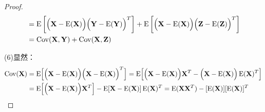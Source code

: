 \begin{proof}
\begin{gather*}
\begin{aligned}
			&=\operatorname{E}\left[\Bigl(\mathbf{X}-\operatorname{E}(\mathbf{X})\Bigr)\Bigl(\mathbf{Y}-\operatorname{E}(\mathbf{Y})\Bigr)^T\right]+\operatorname{E}\left[\Bigl(\mathbf{X}-\operatorname{E}(\mathbf{X})\Bigr)\Bigl(\mathbf{Z}-\operatorname{E}(\mathbf{Z})\Bigr)^T\right] \\
			&=\operatorname{Cov}(\mathbf{X},\mathbf{Y})+\operatorname{Cov}(\mathbf{X},\mathbf{Z})
		\end{aligned}
	\end{gather*}\par
	(6)显然：
	\begin{align*}
		\operatorname{Cov}(\mathbf{X})
		&=\operatorname{E}\Bigl[\Bigl(\mathbf{X}-\operatorname{E}(\mathbf{X})\Bigr)\Bigl(\mathbf{X}-\operatorname{E}(\mathbf{X})\Bigr)^T\Bigr]
		=\operatorname{E}\Bigl[\Bigl(\mathbf{X}-\operatorname{E}(\mathbf{X})\Bigr)\mathbf{X}^T-\Bigl(\mathbf{X}-\operatorname{E}(\mathbf{X})\Bigr)\operatorname{E}(\mathbf{X})^T\Bigr] \\
		&=\operatorname{E}\Bigl[\Bigl(\mathbf{X}-\operatorname{E}(\mathbf{X})\Bigr)\mathbf{X}^T\Bigr]-\operatorname{E}[\mathbf{X}-\operatorname{E}(\mathbf{X})]\operatorname{E}(\mathbf{X})^T =\operatorname{E}(\mathbf{X}\mathbf{X}^T)-[\operatorname{E}(\mathbf{X})][\operatorname{E}(\mathbf{X})]^T\qedhere
	\end{align*}
\end{proof}
